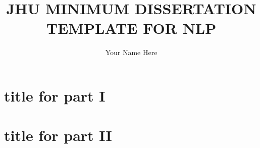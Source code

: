 \documentclass[12pt,oneside,final]{thesis}
\begin{document}
\title{\uppercase{JHU Minimum Dissertation Template for NLP}}
\author{Your Name Here}
\dissertation
\doctorphilosophy
\copyrightnotice



\part{title for part I}

\part{title for part II}

\appendix



%
\printbibliography


\end{document}
